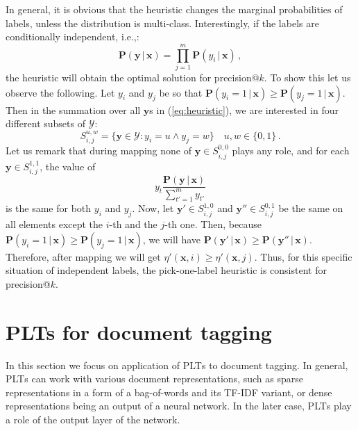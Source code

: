 \documentclass{article}
\newcommand{\Algo}[1]{\textsc{#1}}
\renewcommand{\vec}[1]{\boldsymbol{#1}}
\newcommand{\bx}{\vec{x}}
\newcommand{\by}{\vec{y}}
\newcommand{\calY}{\mathcal{Y}}
\newcommand{\prob}{\mathbf{P}}
\newcommand{\given}{\, | \,}
\newcommand{\sectionBefore}{-0pt}
\newcommand{\sectionAfter}{-0pt}
\begin{document}
{In general, it is obvious that the heuristic changes the marginal probabilities of labels, unless the distribution is multi-class. 
Interestingly, if the labels are conditionally independent, i.e.,:
$$
\prob(\by \given \bx) = \prod_{j=1}^m \prob(y_i \given \bx)\,,
$$
the heuristic will obtain the optimal solution for precision@$k$. To show this let us observe the following.
Let $y_i$ and $y_j$ be so that $\prob(y_i = 1 \given \bx) \ge \prob(y_j = 1 \given \bx) $. Then in the summation over all $\by$s in (\ref{eq:heuristic}), we are interested in four different subsets of $\calY$: 
$$
S_{i,j}^{u,w}  =  \{\by\in \calY: y_i = u \land y_j = w\} \quad u,w \in \{0,1\} \,.
$$
Let us remark that during mapping none of $\by \in S^{0,0}_{i,j}$ plays any role, and for each $\by \in S^{1,1}_{i,j}$, the value of 
$$
y_t \frac{\prob(\by \given \bx)}{\sum_{t'=1}^m y_{t'}}
$$ 
is the same for both $y_i$ and $y_j$. Now, let $\by' \in S^{1,0}_{i,j}$ and $\by'' \in S^{0,1}_{i,j}$ be the same on all elements except the $i$-th and the $j$-th one. Then, because   $\prob(y_i = 1 \given \bx) \ge \prob(y_j = 1 \given \bx) $, we will have $\prob(\by' \given \bx) \ge \prob(\by'' \given \bx)$. Therefore, after mapping we will get $\eta'(\bx,i) \ge \eta'(\bx, j)$. 
Thus, for this specific situation of independent labels, the pick-one-label heuristic is consistent for precision@$k$.

%
%
%




\vspace{\sectionBefore}
\section{PLTs for document tagging}
\label{sec:plt-tagging}
\vspace{\sectionAfter}

In this section we focus on application of \Algo{PLT}s to document tagging. In general, \Algo{PLT}s can work with various document representations, such as sparse representations in a form of a bag-of-words and its TF-IDF variant, or dense representations being an output of a neural network. In the later case, \Algo{PLT}s play a role of the output layer of the network. 
  

}
\end{document}
